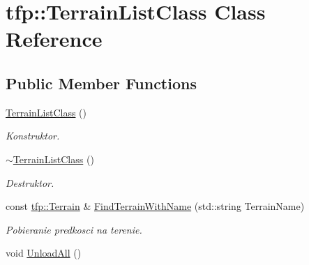 \hypertarget{classtfp_1_1_terrain_list_class}{}\section{tfp\+:\+:Terrain\+List\+Class Class Reference}
\label{classtfp_1_1_terrain_list_class}
\subsection*{Public Member Functions}
\begin{DoxyCompactItemize}
\item 
\mbox{\label{classtfp_1_1_terrain_list_class_a258fdbb5c8d24af01b352806499e4b5e}} 
\mbox{\hyperlink{classtfp_1_1_terrain_list_class_a258fdbb5c8d24af01b352806499e4b5e}{Terrain\+List\+Class}} ()
\begin{DoxyCompactList}\small\item\em Konstruktor. \end{DoxyCompactList}\item 
\mbox{\label{classtfp_1_1_terrain_list_class_a0ff8c574c92db6c610ea46a1735eccec}} 
\mbox{\hyperlink{classtfp_1_1_terrain_list_class_a0ff8c574c92db6c610ea46a1735eccec}{$\sim$\+Terrain\+List\+Class}} ()
\begin{DoxyCompactList}\small\item\em Destruktor. \end{DoxyCompactList}\item 
\mbox{\label{classtfp_1_1_terrain_list_class_ad00f516e35d4b4d11dd834d76b024969}} 
const \mbox{\hyperlink{structtfp_1_1_terrain}{tfp\+::\+Terrain}} \& \mbox{\hyperlink{classtfp_1_1_terrain_list_class_ad00f516e35d4b4d11dd834d76b024969}{Find\+Terrain\+With\+Name}} (std\+::string Terrain\+Name)
\begin{DoxyCompactList}\small\item\em Pobieranie predkosci na terenie. \end{DoxyCompactList}\item 
\mbox{\label{classtfp_1_1_terrain_list_class_a02585b3294f9541289fd3703458dbbfc}} 
void \mbox{\hyperlink{classtfp_1_1_terrain_list_class_a02585b3294f9541289fd3703458dbbfc}{Unload\+All}} ()

\end{DoxyCompactItemize}
